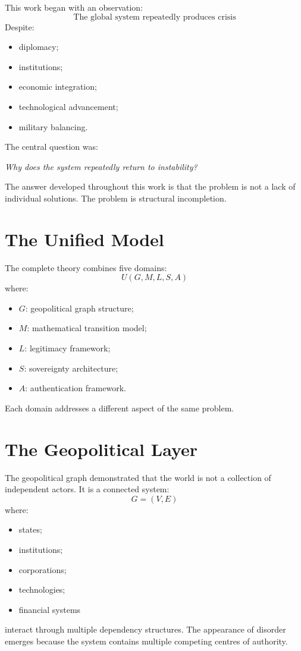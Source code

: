\documentclass[11pt,openany]{book}
\theoremstyle{plain}
\theoremstyle{definition}
\begin{document}
This work began with an observation:
\[
\text{The global system repeatedly produces crisis}
\]
Despite:
\begin{itemize}
\item diplomacy;
\item institutions;
\item economic integration;
\item technological advancement;
\item military balancing.
\end{itemize}
The central question was:
\begin{center}
\textit{
Why does the system repeatedly return to instability?
}
\end{center}
The answer developed throughout this work is that the problem is not a lack of individual solutions. The problem is structural incompletion.

\section{The Unified Model}

The complete theory combines five domains:
\[
U(G, M, L, S, A)
\]
where:
\begin{itemize}
\item \(G\): geopolitical graph structure;
\item \(M\): mathematical transition model;
\item \(L\): legitimacy framework;
\item \(S\): sovereignty architecture;
\item \(A\): authentication framework.
\end{itemize}
Each domain addresses a different aspect of the same problem.

\section{The Geopolitical Layer}

The geopolitical graph demonstrated that the world is not a collection of independent actors. It is a connected system:
\[
G = (V, E)
\]
where:
\begin{itemize}
\item states;
\item institutions;
\item corporations;
\item technologies;
\item financial systems
\end{itemize}
interact through multiple dependency structures. The appearance of disorder emerges because the system contains multiple competing centres of authority.
\end{document}
